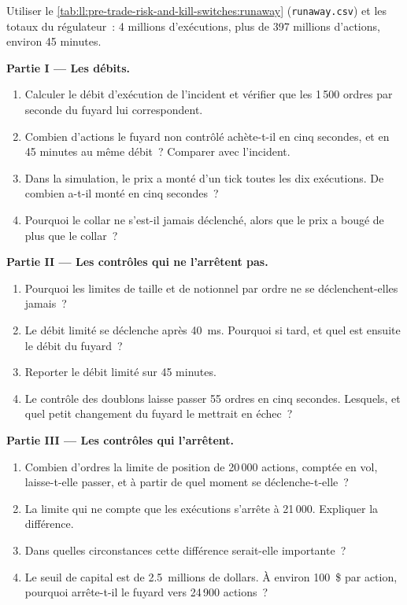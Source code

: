 \begin{problem}\label{pb:ll:pre-trade-risk-and-kill-switches:1}
Utiliser le \cref{tab:ll:pre-trade-risk-and-kill-switches:runaway} (\texttt{runaway.csv}) et les totaux du régulateur~: 4 millions
d'exécutions, plus de 397 millions d'actions, environ 45 minutes.

\medskip\noindent\textbf{Partie I --- Les débits.}
\begin{enumerate}
\item Calculer le débit d'exécution de l'incident et vérifier que les 1\,500 ordres par seconde du fuyard lui correspondent.
\item Combien d'actions le fuyard non contrôlé achète-t-il en cinq secondes, et en 45 minutes au même débit~? Comparer avec
l'incident.
\item Dans la simulation, le prix a monté d'un tick toutes les dix exécutions. De combien a-t-il monté en cinq secondes~?
\item Pourquoi le collar ne s'est-il jamais déclenché, alors que le prix a bougé de plus que le collar~?
\end{enumerate}

\medskip\noindent\textbf{Partie II --- Les contrôles qui ne l'arrêtent pas.}
\begin{enumerate}[resume]
\item Pourquoi les limites de taille et de notionnel par ordre ne se déclenchent-elles jamais~?
\item Le débit limité se déclenche après \qty{40}{\milli\second}. Pourquoi si tard, et quel est ensuite le débit du fuyard~?
\item Reporter le débit limité sur 45 minutes.
\item Le contrôle des doublons laisse passer 55 ordres en cinq secondes. Lesquels, et quel petit changement du fuyard le mettrait en
échec~?
\end{enumerate}

\medskip\noindent\textbf{Partie III --- Les contrôles qui l'arrêtent.}
\begin{enumerate}[resume]
\item Combien d'ordres la limite de position de 20\,000 actions, comptée en vol, laisse-t-elle passer, et à partir de quel moment se déclenche-t-elle~?
\item La limite qui ne compte que les exécutions s'arrête à 21\,000. Expliquer la différence.
\item Dans quelles circonstances cette différence serait-elle importante~?
\item Le seuil de capital est de 2.5~millions de dollars. À environ 100~\$ par action, pourquoi arrête-t-il le fuyard vers 24\,900 actions~?
\end{enumerate}


\end{problem}
